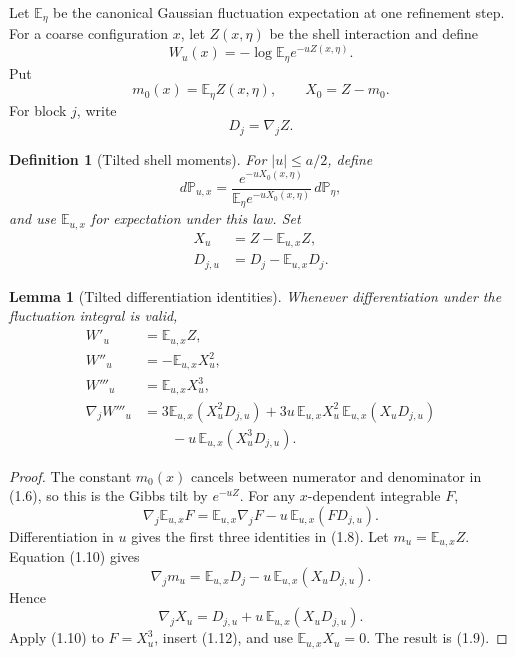 \documentclass[11pt]{article}
\newtheorem{lemma}[theorem]{Lemma}
\newtheorem{definition}[theorem]{Definition}
\theoremstyle{remark}
\begin{document}
Let \(\mathbb E_\eta\) be the canonical Gaussian fluctuation
expectation at one refinement step.  For a coarse configuration
\(x\), let \(Z(x,\eta)\) be the shell interaction and define
\[
 W_u(x)=-\log\mathbb E_\eta e^{-uZ(x,\eta)}.         \tag{1.4}
\]
Put
\[
 m_0(x)=\mathbb E_\eta Z(x,\eta),\qquad
 X_0=Z-m_0.                                         \tag{1.5}
\]
For block \(j\), write
\[
 D_j=\nabla_jZ.
\]

\begin{definition}[Tilted shell moments]
\label{def:v17v1-tilt}
For \(|u|\leq a/2\), define
\[
 d{\mathbb P}_{u,x}
 =
 \frac{e^{-uX_0(x,\eta)}}
 {\mathbb E_\eta e^{-uX_0(x,\eta)}}\,
 d{\mathbb P}_\eta,                                 \tag{1.6}
\]
and use \(\mathbb E_{u,x}\) for expectation under this law.  Set
\[
\begin{split}
 X_u&=Z-\mathbb E_{u,x}Z,\\
 D_{j,u}&=D_j-\mathbb E_{u,x}D_j.                   \tag{1.7}
\end{split}
\]
\end{definition}

\begin{lemma}[Tilted differentiation identities]
\label{lem:v17v1-differentiation}
Whenever differentiation under the fluctuation integral is valid,
\[
\begin{split}
 W'_u&=\mathbb E_{u,x}Z,\\
 W''_u&=-\mathbb E_{u,x}X_u^2,\\
 W'''_u&=\mathbb E_{u,x}X_u^3,                      \tag{1.8}\\
 \nabla_jW'''_u
 &=
 3\mathbb E_{u,x}(X_u^2D_{j,u})
 +3u\,\mathbb E_{u,x}X_u^2\,
       \mathbb E_{u,x}(X_uD_{j,u})\\
 &\qquad
 -u\,\mathbb E_{u,x}(X_u^3D_{j,u}).                \tag{1.9}
\end{split}
\]
\end{lemma}

\begin{proof}
The constant \(m_0(x)\) cancels between numerator and denominator in
(1.6), so this is the Gibbs tilt by \(e^{-uZ}\).  For any
\(x\)-dependent integrable \(F\),
\[
 \nabla_j\mathbb E_{u,x}F
 =
 \mathbb E_{u,x}\nabla_jF
 -u\,\mathbb E_{u,x}(F D_{j,u}).                    \tag{1.10}
\]
Differentiation in \(u\) gives the first three identities in (1.8).
Let \(m_u=\mathbb E_{u,x}Z\).  Equation (1.10) gives
\[
 \nabla_jm_u
 =
 \mathbb E_{u,x}D_j
 -u\,\mathbb E_{u,x}(X_uD_{j,u}).                  \tag{1.11}
\]
Hence
\[
 \nabla_jX_u
 =
 D_{j,u}
 +u\,\mathbb E_{u,x}(X_uD_{j,u}).                  \tag{1.12}
\]
Apply (1.10) to \(F=X_u^3\), insert (1.12), and use
\(\mathbb E_{u,x}X_u=0\).  The result is (1.9).
\end{proof}
\end{document}
